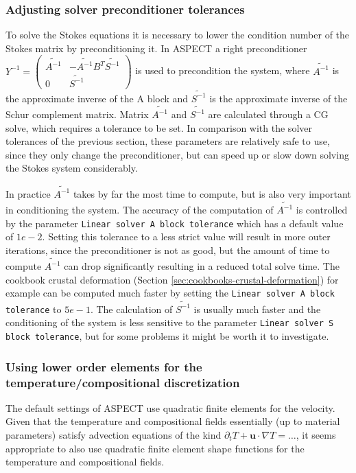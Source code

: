 \documentclass{article}
\newcommand{\aspect}{\textsc{ASPECT}}
\begin{document}
\subsubsection{Adjusting solver preconditioner tolerances} To solve the Stokes 
equations it is necessary to lower the condition number of the
Stokes matrix by preconditioning  it. In \aspect{} a right preconditioner $Y^{-1} = 
\begin{pmatrix}
\widetilde{A^{-1}} & -\widetilde{A^{-1}}B^{T}\widetilde{S^{-1}} \\
0 & \widetilde{S^{-1}}
\end{pmatrix}$ is used to precondition the system, where $\widetilde{A^{-1}}$ is 
the approximate inverse of the A block and $\widetilde{S^{-1}}$ is the approximate 
inverse of the Schur complement matrix. Matrix $\widetilde{A^{-1}}$ and 
$\widetilde{S^{-1}}$ are calculated through a CG solve, which requires a tolerance 
to be set. In comparison with the solver tolerances of the previous section, these 
parameters are relatively safe to use, since they only change the preconditioner, 
but can speed up or slow down solving the Stokes system considerably. 

In practice $\widetilde{A^{-1}}$ takes by far the most time to compute, but is 
also very important in conditioning the system. The accuracy of the computation 
of $\widetilde{A^{-1}}$ is controlled by the parameter \texttt{Linear solver A 
block tolerance} which has a default value of $1e-2$. Setting this tolerance 
to a less strict value will result in more outer iterations, since the 
preconditioner is not as good, but the amount of time to compute 
$\widetilde{A^{-1}}$ can drop significantly resulting in a reduced total solve 
time. The cookbook crustal deformation (Section 
\ref{sec:cookbooks-crustal-deformation}) for example can be computed much faster 
by setting the \texttt{Linear solver A block tolerance} to $5e-1$. The 
calculation of $\widetilde{S^{-1}}$ is usually much faster and the 
conditioning of the system is less sensitive to the parameter \texttt{Linear 
solver S block tolerance}, but for some problems it might be worth it to 
investigate.

\subsubsection{Using lower order elements for the temperature/compositional discretization}
The default settings of \aspect{} use quadratic finite elements for the
velocity. Given that the temperature and compositional fields essentially (up
to material parameters) satisfy advection equations of the kind $\partial_t T +
\mathbf u \cdot \nabla T = \ldots$, it seems appropriate to also use quadratic
finite element shape functions for the temperature and compositional fields.
\end{document}
